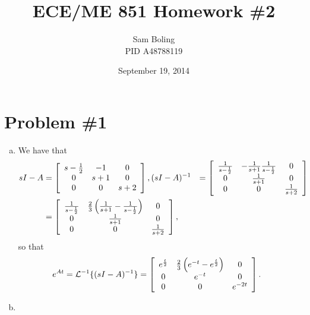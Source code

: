 \documentclass{article}
\title{ECE/ME 851 Homework \#2}
\date{September 19, 2014}
\author{Sam Boling \\ PID A48788119}
\begin{document}
\maketitle

\section*{Problem \#1}
\begin{enumerate}[(a)]
  \item{We have that
        \begin{align*}
          sI - A &=
            \left[\begin{array}{c c c}
              s - \frac{1}{2} & -1    & 0 \\
              0               & s + 1 & 0 \\
              0               & 0     & s + 2
            \end{array}\right],
          (sI - A)^{-1} &=
            \left[\begin{array}{c c c}
              \frac{1}{s - \frac{1}{2}}
            & -\frac{1}{s+1}\frac{1}{s - \frac{1}{2}}
            & 0 \\
              0
            & \frac{1}{s+1}
            & 0 \\
              0
            & 0
            & \frac{1}{s+2}
            \end{array}\right] \\
          &= \left[\begin{array}{c c c}
               \frac{1}{s - \frac{1}{2}}
             &  \frac{2}{3}\left(
                  \frac{1}{s + 1}
                 -\frac{1}{s - \frac{1}{2}}\right)
             & 0 \\
               0
             & \frac{1}{s+1}
             & 0 \\
               0
             & 0
             & \frac{1}{s+2}
             \end{array}\right],
        \end{align*}
        so that
        \begin{align*}
          e^{At} &= \mathcal{L}^{-1}\{(sI - A)^{-1}\}
                 = \left[\begin{array}{c c c}
                     e^{\frac{t}{2}}
                   & \frac{2}{3}\left(
                       e^{-t} - e^{\frac{t}{2}}
                     \right)
                   & 0 \\
                     0 
                   & e^{-t}
                   & 0 \\
                     0
                   & 0
                   & e^{-2t}
                   \end{array}\right].
        \end{align*}
       }
       \item{
            }
\end{enumerate}
\end{document}

